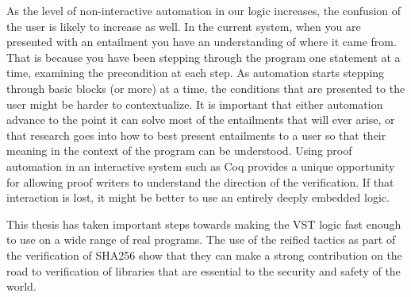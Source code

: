 \documentclass{puthesis}
\begin{document}
As the level of non-interactive
automation in our logic increases, the confusion of the user is likely
to increase as well. In the current system, when you are presented
with an entailment you have an understanding of where it came
from. That is because you have been stepping through the program one
statement at a time, examining the precondition at each step. As
automation starts stepping through basic blocks (or more) at a time,
the conditions that are presented to the user might be harder to
contextualize. It is important that either automation advance to the
point it can solve most of the entailments that will ever arise, or
that research goes into how to best present entailments to a user so
that their meaning in the context of the program can be
understood. Using proof automation in an interactive system such as
Coq provides a unique opportunity for allowing proof writers to
understand the direction of the verification. If that interaction is
lost, it might be better to use an entirely deeply embedded logic.

This thesis has taken important steps towards making the VST logic
fast enough to use on a wide range of real programs. The use of the
reified tactics as part of the verification of SHA256 show that they
can make a strong contribution on the road to verification of
libraries that are essential to the security and safety of the world.



\end{document}
